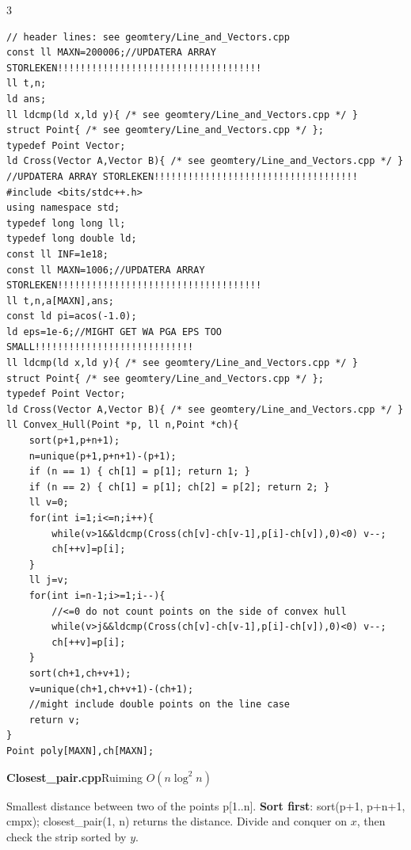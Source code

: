 \documentclass[9pt,a4paper]{extarticle}
\newcommand{\entry}[3]{%
  \addcontentsline{toc}{subsection}{#1}%
  \vspace{0.8ex}%
  \noindent\colorbox{hdbg}{\parbox{\dimexpr\columnwidth-2\fboxsep}{%
    \strut\textbf{#1}\hfill{\footnotesize\textsf{#2}}}}\par
  \vspace{0.4ex}%
  {\footnotesize #3\par}%
}
\newcommand{\code}[1]{{\ttfamily\small #1}}
\begin{document}
\begin{multicols*}{3}
\begin{lstlisting}[breaklines=true]
// header lines: see geomtery/Line_and_Vectors.cpp
const ll MAXN=200006;//UPDATERA ARRAY STORLEKEN!!!!!!!!!!!!!!!!!!!!!!!!!!!!!!!!!!!!
ll t,n;
ld ans;
ll ldcmp(ld x,ld y){ /* see geomtery/Line_and_Vectors.cpp */ }
struct Point{ /* see geomtery/Line_and_Vectors.cpp */ };
typedef Point Vector;
ld Cross(Vector A,Vector B){ /* see geomtery/Line_and_Vectors.cpp */ }
//UPDATERA ARRAY STORLEKEN!!!!!!!!!!!!!!!!!!!!!!!!!!!!!!!!!!!!
#include <bits/stdc++.h>
using namespace std;
typedef long long ll;
typedef long double ld;
const ll INF=1e18;
const ll MAXN=1006;//UPDATERA ARRAY STORLEKEN!!!!!!!!!!!!!!!!!!!!!!!!!!!!!!!!!!!!
ll t,n,a[MAXN],ans;
const ld pi=acos(-1.0);
ld eps=1e-6;//MIGHT GET WA PGA EPS TOO SMALL!!!!!!!!!!!!!!!!!!!!!!!!!!!!
ll ldcmp(ld x,ld y){ /* see geomtery/Line_and_Vectors.cpp */ }
struct Point{ /* see geomtery/Line_and_Vectors.cpp */ };
typedef Point Vector;
ld Cross(Vector A,Vector B){ /* see geomtery/Line_and_Vectors.cpp */ }
ll Convex_Hull(Point *p, ll n,Point *ch){
    sort(p+1,p+n+1);
    n=unique(p+1,p+n+1)-(p+1);
    if (n == 1) { ch[1] = p[1]; return 1; }
    if (n == 2) { ch[1] = p[1]; ch[2] = p[2]; return 2; }
    ll v=0;
    for(int i=1;i<=n;i++){
        while(v>1&&ldcmp(Cross(ch[v]-ch[v-1],p[i]-ch[v]),0)<0) v--;
        ch[++v]=p[i];
    }
    ll j=v;
    for(int i=n-1;i>=1;i--){
        //<=0 do not count points on the side of convex hull
        while(v>j&&ldcmp(Cross(ch[v]-ch[v-1],p[i]-ch[v]),0)<0) v--;
        ch[++v]=p[i];
    }
    sort(ch+1,ch+v+1);
    v=unique(ch+1,ch+v+1)-(ch+1);
    //might include double points on the line case
    return v;
}
Point poly[MAXN],ch[MAXN];
\end{lstlisting}

\entry{Closest\_pair.cpp}{Ruiming \quad $O(n \log^2 n)$}{Smallest distance between two of the points \code{p[1..n]}. \textbf{Sort first}: \code{sort(p+1, p+n+1, cmpx); closest\_pair(1, n)} returns the distance. Divide and conquer on $x$, then check the strip sorted by $y$.}


\end{multicols*}
\end{document}
